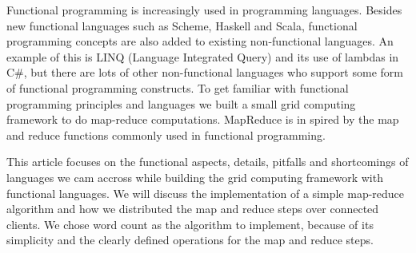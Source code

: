 Functional programming is increasingly used in programming languages. Besides new functional languages such as Scheme, Haskell and Scala, 
functional programming concepts are also added to existing non-functional languages. An example of this is LINQ (Language Integrated Query) 
and its use of lambdas in C\#, but there are lots of other non-functional languages who support some form of functional programming constructs.
To get familiar with functional programming principles and languages we built a small grid computing framework to do map-reduce computations.
MapReduce is in spired by the map and reduce functions commonly used in functional programming.

This article focuses on the functional aspects, details, pitfalls and shortcomings of languages we cam accross while building the grid computing framework
with functional languages. We will discuss the implementation of a simple map-reduce algorithm and how we distributed the map and reduce steps over connected clients. 
We chose word count as the algorithm to implement, because of its simplicity and the clearly defined operations for the map and reduce steps.